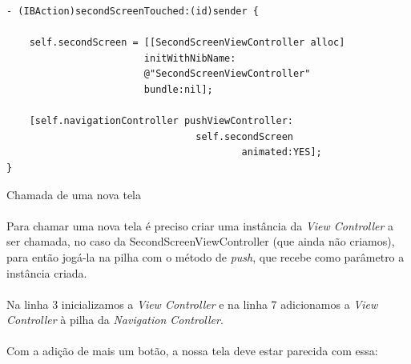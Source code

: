 \documentclass[a4paper,12pt,brazil,doubleside]{book}
\begin{document}
\begin{singlespace}
\begin{listing}[H]
\begin{verbatim}
- (IBAction)secondScreenTouched:(id)sender {
    
    self.secondScreen = [[SecondScreenViewController alloc]
                        initWithNibName:
                        @"SecondScreenViewController"
                        bundle:nil];
    
    [self.navigationController pushViewController:
    							 self.secondScreen
                                         animated:YES];
}
\end{verbatim}
\caption{Chamada de uma nova tela}
\end{listing}

\paragraph{}Para chamar uma nova tela é preciso criar uma instância da \emph{View Controller} a ser chamada, no caso da SecondScreenViewController (que ainda não criamos), para então jogá-la na pilha com o método de \emph{push}, que recebe como parâmetro a instância criada.
\paragraph{}Na linha 3 inicializamos a \emph{View Controller} e na linha 7 adicionamos a \emph{View Controller} à pilha da \emph{Navigation Controller}.
\paragraph{}Com a adição de mais um botão, a nossa tela deve estar parecida com essa:

\bigskip
\bigskip


\end{singlespace}
\end{document}
